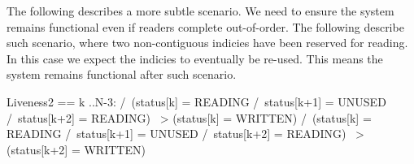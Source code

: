 The following describes a more subtle scenario. We need to ensure the system
remains functional even if readers complete out-of-order. The following describe
such scenario, where two non-contiguous indicies have been reserved for reading.
In this case we expect the indicies to eventually be re-used. This means the
system remains functional after such scenario.\newline

\begin{tla}
Liveness2 == 
    \A k ..N-3:
    /\ (status[k] = READING /\ status[k+1] = UNUSED /\ status[k+2] = READING)
        ~> (status[k] = WRITTEN)
    /\ (status[k] = READING /\ status[k+1] = UNUSED /\ status[k+2] = READING)
        ~> (status[k+2] = WRITTEN)
\end{tla}
\begin{tlatex}
%
%
%
%
\end{tlatex}

% 
